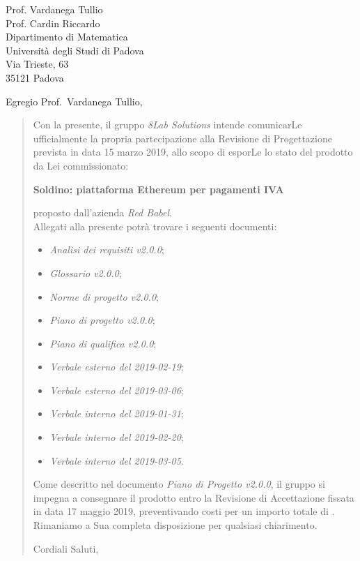 
\begin{letter}{
		Prof. Vardanega Tullio \\
		Prof. Cardin Riccardo \\
		Dipartimento di Matematica \\
		Università degli Studi di Padova \\
		Via Trieste, 63 \\
		35121 Padova}
		
\opening{Egregio Prof.~Vardanega Tullio,}

\begin{quotation}
Con la presente, il gruppo \textit{8Lab Solutions} intende 
comunicarLe ufficialmente la propria partecipazione alla Revisione di 
Progettazione prevista in data 15 marzo 2019, allo scopo di 
esporLe lo stato del prodotto da Lei commissionato:

\begin{center}
	\textbf{Soldino: piattaforma Ethereum per pagamenti IVA}
\end{center}

\noindent proposto dall'azienda \textit{Red Babel}. \\
Allegati alla presente potrà trovare i seguenti documenti:

\begin{itemize}
	\item \textit{Analisi dei requisiti v2.0.0};
	
	\item \textit{Glossario v2.0.0};
	
	\item \textit{Norme di progetto v2.0.0};

	\item \textit{Piano di progetto v2.0.0};

	\item \textit{Piano di qualifica v2.0.0};
	
	\item \textit{Verbale esterno del 2019-02-19};
	\item \textit{Verbale esterno del 2019-03-06};
	\item \textit{Verbale interno del 2019-01-31};
	\item \textit{Verbale interno del 2019-02-20};
	\item \textit{Verbale interno del 2019-03-05}.
\end{itemize}


\noindent Come descritto nel documento \textit{Piano di Progetto v2.0.0}, il 
gruppo si impegna a consegnare il prodotto entro la Revisione di Accettazione 
fissata in data 17 maggio 2019, preventivando costi per un importo 
totale di \textbf{}.\\
Rimaniamo a Sua completa disposizione per qualsiasi chiarimento.

\vspace{0.15cm}
\closing{ Cordiali Saluti,}
	

\end{quotation}
		
\end{letter}

